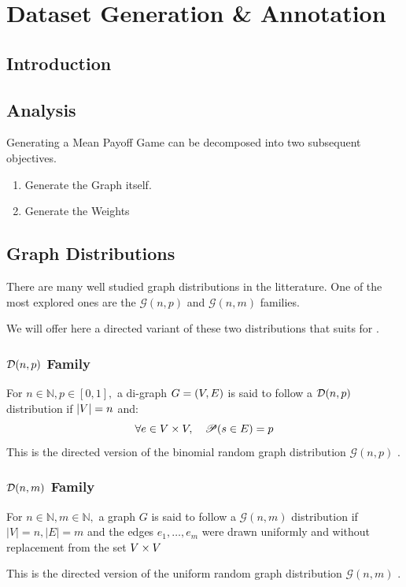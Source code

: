 \chapter{Dataset Generation \& Annotation}
\label{section:Dataset}
\label{chapter:Dataset}
\section{Introduction}
\section{Analysis}
Generating a Mean Payoff Game can be decomposed into two subsequent objectives.
\begin{enumerate}
	\item Generate the Graph itself.
	\item Generate the Weights
\end{enumerate}


\section{Graph Distributions}
There are many well studied graph distributions in the litterature. One of the most explored ones are the $\mathcal{G}(n,p)$ and $\mathcal{G}(n,m)$ families.

We will offer here a directed variant of these two distributions that suits for .
\subsection{$\mathcal{D}(n,p)$ Family}
For $n\in\mathbb{N},p\in[0,1],$ a di-graph $G=(V,E)$ is said to follow a $\mathcal{D}(n,p)$ distribution if $\lvert V \rvert=n$ and:
$$
\forall e\in V\times V, \quad \mathscr{P}(s\in E)=p
$$
This is the directed version of the binomial random graph distribution $\mathcal{G}(n,p)$ \cite[Section.~1.1]{RandomGraphs}.

\subsection{$\mathcal{D}(n,m)$ Family}
For $n\in\mathbb{N},m\in\mathbb{N},$ a graph $G$ is said to follow a $\mathcal{G}(n,m)$ distribution if $\lvert V \rvert=n,\lvert  E \rvert=m$ and the edges $e_1,\dots,e_m$ were drawn uniformly and without replacement from the set $V\times V$

This is the directed version of the uniform random graph distribution $\mathcal{G}(n,m)$ \cite[Section.~1.1]{RandomGraphs}.

